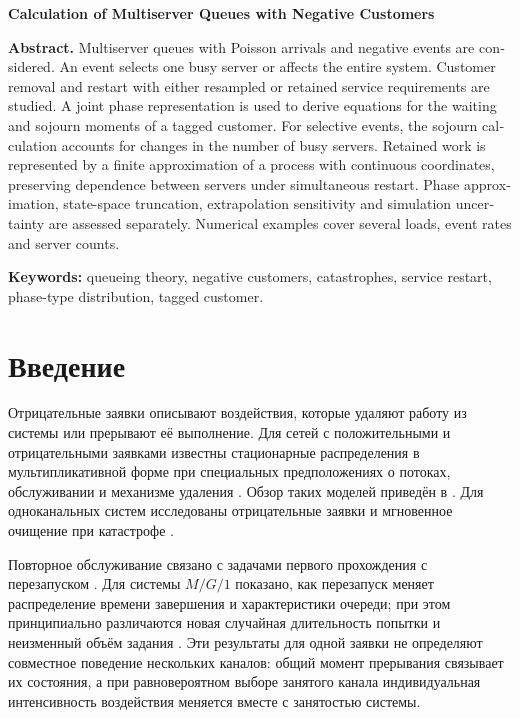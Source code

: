\documentclass[a4paper,12pt]{article}
\begin{document}
\begin{otherlanguage}{english}
\bigskip
\begin{center}\textbf{Calculation of Multiserver Queues with Negative Customers}\end{center}
\textbf{Abstract.} Multiserver queues with Poisson arrivals and negative events are considered. An event selects one busy server or affects the entire system. Customer removal and restart with either resampled or retained service requirements are studied. A joint phase representation is used to derive equations for the waiting and sojourn moments of a tagged customer. For selective events, the sojourn calculation accounts for changes in the number of busy servers. Retained work is represented by a finite approximation of a process with continuous coordinates, preserving dependence between servers under simultaneous restart. Phase approximation, state-space truncation, extrapolation sensitivity and simulation uncertainty are assessed separately. Numerical examples cover several loads, event rates and server counts.

\textbf{Keywords:} queueing theory, negative customers, catastrophes, service restart, phase-type distribution, tagged customer.
\end{otherlanguage}

\section{Введение}
Отрицательные заявки описывают воздействия, которые удаляют работу из системы или прерывают её выполнение. Для сетей с положительными и отрицательными заявками известны стационарные распределения в мультипликативной форме при специальных предположениях о потоках, обслуживании и механизме удаления \cite{gelenbe1991,gelenbe1992}. Обзор таких моделей приведён в \cite{artalejo2000}. Для одноканальных систем исследованы отрицательные заявки \cite{harrison1996} и мгновенное очищение при катастрофе \cite{jain1996}.

Повторное обслуживание связано с задачами первого прохождения с перезапуском \cite{pal2017}. Для системы \(M/G/1\) показано, как перезапуск меняет распределение времени завершения и характеристики очереди; при этом принципиально различаются новая случайная длительность попытки и неизменный объём задания \cite{bonomo2022}. Эти результаты для одной заявки не определяют совместное поведение нескольких каналов: общий момент прерывания связывает их состояния, а при равновероятном выборе занятого канала индивидуальная интенсивность воздействия меняется вместе с занятостью системы.
\end{document}
